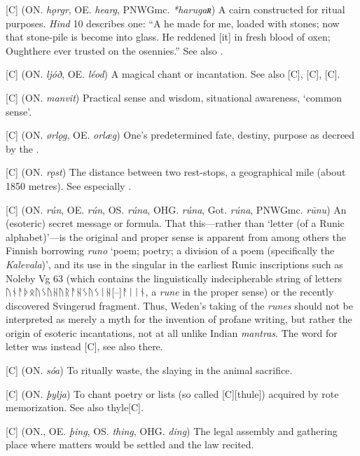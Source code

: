 \begin{itemize}
[C] (ON. \emph{hǫrgr}, OE. \emph{hearg}, PNWGmc. \emph{*harugaʀ})
  A cairn constructed for ritual purposes. \emph{Hind} 10 describes one: “A  he made for me, loaded with stones; now that stone-pile is become into glass. He reddened [it] in fresh blood of oxen; Oughthere ever trusted on the osennies.” See also .

[C] (ON. \emph{ljóð}, OE. \emph{léod})
  A magical chant or incantation. See also [C], [C], [C].

[C] (ON. \emph{manvit})
  Practical sense and wisdom, situational awareness, ‘common sense’.

[C] (ON. \emph{ørlǫg}, OE. \emph{orlæg})
  One’s predetermined fate, destiny, purpose as decreed by the .

[C] (ON. \emph{rǫst})
  The distance between two rest-stops, a geographical mile (about 1850 metres). See especially \CV.

[C] (ON. \emph{rún}, OE. \emph{rún}, OS. \emph{rúna}, OHG. \emph{rúna}, Got. \emph{rúna}, PNWGmc. \emph{rūnu})
  An (esoteric) secret message or formula. That this—rather than ‘letter (of a Runic alphabet)’—is the original and proper sense is apparent from among others the Finnish borrowing \emph{runo} ‘poem; poetry; a division of a poem (specifically the \emph{Kalevala})’, and its use in the singular in the earliest Runic inscriptions such as Noleby Vg 63 (which contains the linguistically indecipherable string of letters ᚢᚾᚨᚦᛟᚢᛊᚢᚺᚢᚱᚨᚺᛊᚢᛊᛁᚺ[--]ᚨᛁᛁᚾ, a \emph{rune} in the proper sense) or the recently discovered Svingerud fragment. Thus, Weden’s taking of the \emph{runes} should not be interpreted as merely a myth for the invention of profane writing, but rather the origin of esoteric incantations, not at all unlike Indian \emph{mantras}.
  The word for letter was instead [C], see also there.

[C] (ON. \emph{sóa})
  To ritually waste, the slaying in the animal sacrifice.

[C] (ON. \emph{þylja})
  To chant poetry or lists (so called [C][thule]) acquired by rote memorization. See also {thyle}[C].

[C] (ON., OE. \emph{þing}, OS. \emph{thing}, OHG. \emph{ding})
  The legal assembly and gathering place where matters would be settled and the law recited.


\end{itemize}
